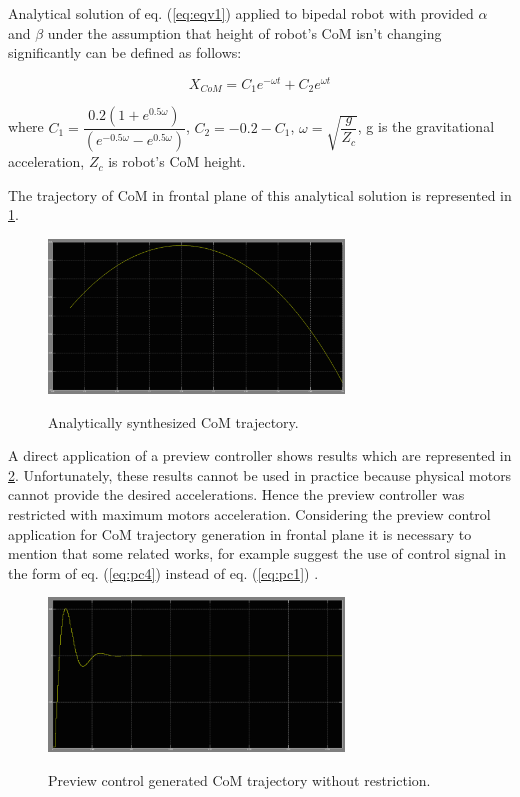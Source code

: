 \documentclass[12pt,a4paper]{report}
\begin{document}
			Analytical solution of eq. (\ref{eq:eqv1}) applied to bipedal robot with provided $\alpha$ and $\beta$ under the assumption that height of robot's CoM isn't changing significantly can be defined as follows:
			
			\begin{equation}
				X_{CoM} = C_1 e^{-\omega t} + C_2 e^{\omega t}
			\end{equation}
			
			where $C_1 = \dfrac{0.2(1+e^{0.5\omega })}{(e^{-0.5\omega }-e^{0.5\omega })}$, $C_2=-0.2-C_1$, $\omega = \sqrt{\dfrac{g}{Z_c}}$, g is the gravitational acceleration, $Z_c$ is robot's CoM height.
			
			The trajectory of CoM in frontal plane of this analytical solution is represented in \cref{fig:24}.
			
			\begin{figure}[H]
				\vspace{-0.2cm}
				\centering
				{\includegraphics[width=0.7\textwidth]{24}}
				\caption{Analytically synthesized CoM trajectory.}
				\label{fig:24}
				\vspace{-0.1cm}
			\end{figure}
			
			A direct application of a preview controller shows results which are represented in \cref{fig:25}. Unfortunately, these results cannot be used in practice because physical motors cannot provide the desired accelerations. Hence the preview controller was restricted with maximum motors acceleration.
			Considering the preview control application for CoM trajectory generation in frontal plane it is necessary to mention that some related works, for example \cite{choi2006fuzzy} suggest the use of control signal in the form of eq. (\ref{eq:pc4}) instead of eq. (\ref{eq:pc1}) .
			
			\begin{figure}[H]
				\vspace{-0.2cm}
				\centering
				{\includegraphics[width=0.7\textwidth]{25}}
				\caption{Preview control generated CoM trajectory without restriction.}
				\label{fig:25}
				\vspace{-0.1cm}
			\end{figure}
			
\end{document}
